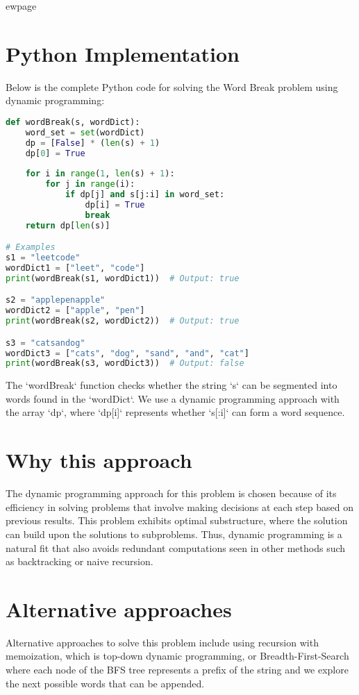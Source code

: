 ewpage %
\section*{Python Implementation}
Below is the complete Python code for solving the Word Break problem using dynamic programming:

\begin{fullwidth}
\begin{lstlisting}[language=Python]
def wordBreak(s, wordDict):
    word_set = set(wordDict)
    dp = [False] * (len(s) + 1)
    dp[0] = True
    
    for i in range(1, len(s) + 1):
        for j in range(i):
            if dp[j] and s[j:i] in word_set:
                dp[i] = True
                break
    return dp[len(s)]

# Examples
s1 = "leetcode"
wordDict1 = ["leet", "code"]
print(wordBreak(s1, wordDict1))  # Output: true

s2 = "applepenapple"
wordDict2 = ["apple", "pen"]
print(wordBreak(s2, wordDict2))  # Output: true

s3 = "catsandog"
wordDict3 = ["cats", "dog", "sand", "and", "cat"]
print(wordBreak(s3, wordDict3))  # Output: false
\end{lstlisting}

\end{fullwidth}

The `wordBreak` function checks whether the string `s` can be segmented into words found in the `wordDict`. We use a dynamic programming approach with the array `dp`, where `dp[i]` represents whether `s[:i]` can form a word sequence.

\section*{Why this approach}
The dynamic programming approach for this problem is chosen because of its efficiency in solving problems that involve making decisions at each step based on previous results. This problem exhibits optimal substructure, where the solution can build upon the solutions to subproblems. Thus, dynamic programming is a natural fit that also avoids redundant computations seen in other methods such as backtracking or naive recursion.

\section*{Alternative approaches}
Alternative approaches to solve this problem include using recursion with memoization, which is top-down dynamic programming, or Breadth-First-Search where each node of the BFS tree represents a prefix of the string and we explore the next possible words that can be appended.

